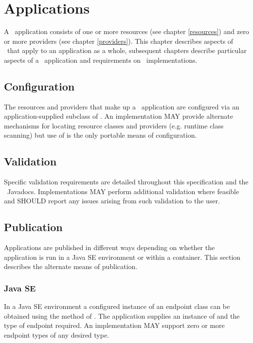 \chapter{Applications}
\label{applications}

A \jaxrs\ application consists of one or more resources (see chapter \ref{resources}) and zero or more providers (see chapter \ref{providers}). This chapter describes aspects of \jaxrs\ that apply to an application as a whole, subsequent chapters describe particular aspects of a \jaxrs\ application and requirements on \jaxrs\ implementations.

\section{Configuration}
\label{config}

The resources and providers that make up a \jaxrs\ application are configured via an application-supplied subclass of . An implementation MAY provide alternate mechanisms for locating resource classes and providers (e.g. runtime class scanning) but use of  is the only portable means of configuration.

\section{Validation}

Specific validation requirements are detailed throughout this specification and the \jaxrs\ Javadocs. Implementations MAY perform additional validation where feasible and SHOULD report any issues arising from such validation to the user.

\section{Publication}

Applications are published in different ways depending on whether the application is run in a Java SE environment or within a container. This section describes the alternate means of publication.

\subsection{Java SE}

In a Java SE environment a configured instance of an endpoint class can be obtained using the  method of \rd. The application supplies an instance of  and the type of endpoint required. An implementation MAY support zero or more endpoint types of any desired type.

